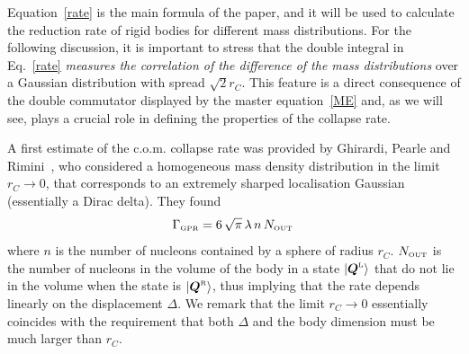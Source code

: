 \documentclass[11pt,onecolumn,amssymb,nofootinbib]{revtex4}
\newcommand\beq{\begin{equation}}
\newcommand\eeq{\end{equation}}
\newcommand\bQ{\boldsymbol{Q}}
\begin{document}
Equation~\eqref{rate} is the main formula of the paper, and it will be used to calculate the reduction rate of rigid bodies for different mass distributions. For the following discussion, it is important to stress that the double integral in Eq.~\eqref{rate} \emph{measures the correlation of the difference of the mass distributions} over a Gaussian distribution with spread $\sqrt{2}r_C$. This feature is a direct consequence of the double commutator displayed by the master equation~\eqref{ME} and, as we will see, plays a crucial role in defining the properties of the collapse rate.

A first estimate of the c.o.m. collapse rate was provided by Ghirardi, Pearle and Rimini~\cite{CSL}, who considered a homogeneous mass density distribution in the limit $r_C\rightarrow0$, that corresponds to an extremely sharped localisation Gaussian (essentially a Dirac delta). They found
\beq\label{gpr}
\Gamma_{\text{\tiny{GPR}}}=6\,\sqrt{\pi}\,\lambda \,n\, N_{\text{\tiny{OUT}}}\,
\eeq
where $n$ is the number of nucleons contained by a sphere of radius $r_C$. $N_{\text{\tiny{OUT}}}$ is the number of nucleons in the volume of the body in a state $|\bQ^{\text{\tiny{L}}}\rangle$ that do not lie in the volume when the state is $|\bQ^{\text{\tiny{R}}}\rangle$, thus implying that the rate depends linearly on the displacement $\Delta$. We remark that the limit $r_C\rightarrow0$ essentially coincides with the requirement that both $\Delta$ and the body dimension must be much larger than $r_C$.
\end{document}
